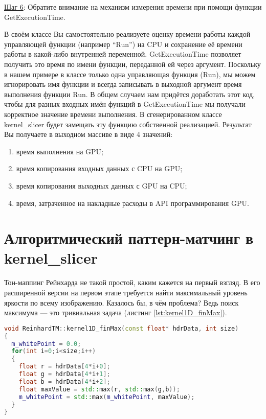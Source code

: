 \documentclass[11pt,fleqn,english,russian]{report} %
\begin{document}
\vspace*{5px}
\noindent\underline{Шаг 6}: Обратите внимание на механизм измерения времени при помощи функции GetExecutionTime. 

В своём классе Вы самостоятельно реализуете оценку времени работы каждой управляющей функции (например ``Run'') на CPU и сохранение её времени работы в какой-либо внутренней переменной. GetExecutionTime позволяет получить это время по имени функции, переданной ей через аргумент. Поскольку в нашем примере в классе только одна управляющая функция (Run), мы можем игнорировать имя функции и всегда записывать в выходной аргумент время выполнения функции Run. В общем случаем нам придётся доработать этот код, чтобы для разных входных имён функций в GetExecutionTime мы получали корректное значение времени выполнения. В сгенерированном классе kernel\_slicer будет замещать эту функцию собственной реализацией. Результат Вы получаете в выходном массиве в виде 4 значений: 

\begin{enumerate}
\item время выполнения на GPU;
\item время копирования входных данных с CPU на GPU;
\item время копирования выходных данных с GPU на CPU;
\item время, затраченное на накладные расходы в API программирования GPU.
\end{enumerate}

\section{Алгоритмический паттерн-матчинг в kernel\_slicer}

Тон-маппинг Рейнхарда не такой простой, каким кажется на первый взгляд. В его расширенной версии на первом этапе требуется найти максимальный уровень яркости по всему изображению. Казалось бы, в чём проблема? Ведь поиск максимума --- это тривиальная задача (листинг \ref{lst:kernel1D_finMax}).

\begin{lstlisting}[language=C++, 
  	               caption=вычислительное ядро поиска максимума с алгоритмическим паттерном редукции, 
	               label=lst:kernel1D_finMax]	
void ReinhardTM::kernel1D_finMax(const float* hdrData, int size)
{
  m_whitePoint = 0.0;
  for(int i=0;i<size;i++)
  {
    float r = hdrData[4*i+0];
    float g = hdrData[4*i+1];
    float b = hdrData[4*i+2];
    float maxValue = std::max(r, std::max(g,b));
    m_whitePoint = std::max(m_whitePoint, maxValue);
  }  
}
\end{lstlisting}
\end{document}
